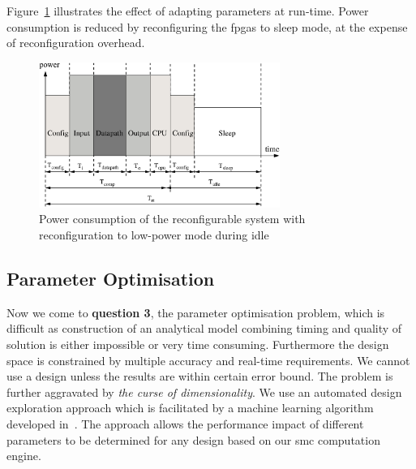Figure~\ref{fig:timing2b} illustrates the effect of adapting parameters at run-time.
Power consumption is reduced by reconfiguring the \glspl{fpga} to sleep mode, at the expense of reconfiguration overhead.

\begin{figure}[t!]
\begin{center}
\includegraphics[width=0.7\textwidth]{4_adaptation/figures/fig_timing2}
\end{center}
\caption{Power consumption of the reconfigurable system with reconfiguration to low-power mode during idle}
\label{fig:timing2b}
\end{figure}

\subsection{Parameter Optimisation}
\label{sec:flow_dse}

Now we come to \textbf{question 3}, the parameter optimisation problem, which is difficult as construction of an analytical model combining timing and quality of solution is either impossible or very time consuming. 
Furthermore the design space is constrained by multiple accuracy and real-time requirements.
We cannot use a design unless the results are within certain error bound.
The problem is further aggravated by \textit{the curse of dimensionality}.
We use an automated design exploration approach which is facilitated by a machine learning algorithm developed in~\cite{kurek14fccm}.
The approach allows the performance impact of different parameters to be determined for any design based on our \gls{smc} computation engine. 

